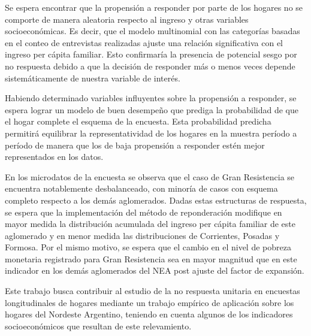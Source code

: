 \documentclass{article}
\begin{document}
Se espera encontrar que la propensión a responder por parte de los hogares no se comporte de manera aleatoria respecto al ingreso y otras variables socioeconómicas. Es decir, que el modelo multinomial con las categorías basadas en el conteo de entrevistas realizadas ajuste una relación significativa con el ingreso per cápita familiar. Esto confirmaría la presencia de potencial sesgo por no respuesta debido a que la decisión de responder más o menos veces depende sistemáticamente de nuestra variable de interés. 

Habiendo determinado variables influyentes sobre la propensión a responder, se espera lograr un modelo de buen desempeño que prediga la probabilidad de que el hogar complete el esquema de la encuesta. Esta probabilidad predicha permitirá equilibrar la representatividad de los hogares en la muestra período a período de manera que los de baja propensión a responder estén mejor representados en los datos.

En los microdatos de la encuesta se observa que el caso de Gran Resistencia se encuentra notablemente desbalanceado, con minoría de casos con esquema completo respecto a los demás aglomerados. Dadas estas estructuras de respuesta, se espera que la implementación del método de reponderación modifique en mayor medida la distribución acumulada del ingreso per cápita familiar de este aglomerado y en menor medida las distribuciones de Corrientes, Posadas y Formosa. Por el mismo motivo, se espera que el cambio en el nivel de pobreza monetaria registrado para Gran Resistencia sea en mayor magnitud que en este indicador en los demás aglomerados del NEA post ajuste del factor de expansión.

Este trabajo busca contribuir al estudio de la no respuesta unitaria en encuestas longitudinales de hogares mediante un trabajo empírico de aplicación sobre los hogares del Nordeste Argentino, teniendo en cuenta algunos de los indicadores socioeconómicos que resultan de este relevamiento.

\printbibliography
\end{document}
